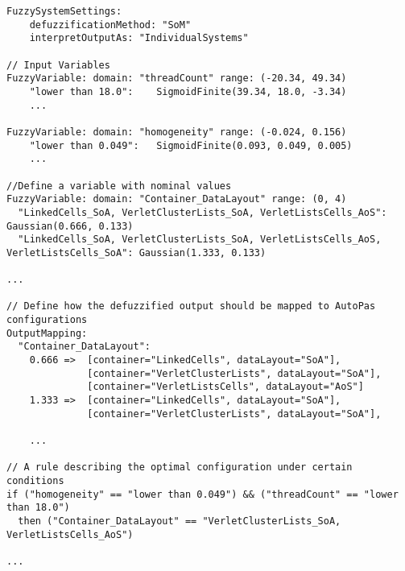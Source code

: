 \begin{lstlisting}[language=FuzzyLanguage, caption={Rule snippet depicting the Parameter Tuning Approach}, label={lst:parametertuningapproach}]
FuzzySystemSettings:
    defuzzificationMethod: "SoM"
    interpretOutputAs: "IndividualSystems"

// Input Variables
FuzzyVariable: domain: "threadCount" range: (-20.34, 49.34)
    "lower than 18.0":    SigmoidFinite(39.34, 18.0, -3.34)
    ...

FuzzyVariable: domain: "homogeneity" range: (-0.024, 0.156)
    "lower than 0.049":   SigmoidFinite(0.093, 0.049, 0.005)
    ...

//Define a variable with nominal values
FuzzyVariable: domain: "Container_DataLayout" range: (0, 4)
  "LinkedCells_SoA, VerletClusterLists_SoA, VerletListsCells_AoS":                       Gaussian(0.666, 0.133)
  "LinkedCells_SoA, VerletClusterLists_SoA, VerletListsCells_AoS, VerletListsCells_SoA": Gaussian(1.333, 0.133)

...

// Define how the defuzzified output should be mapped to AutoPas configurations
OutputMapping:
  "Container_DataLayout":
    0.666 =>  [container="LinkedCells", dataLayout="SoA"],
              [container="VerletClusterLists", dataLayout="SoA"],
              [container="VerletListsCells", dataLayout="AoS"]
    1.333 =>  [container="LinkedCells", dataLayout="SoA"],
              [container="VerletClusterLists", dataLayout="SoA"],

    ...

// A rule describing the optimal configuration under certain conditions
if ("homogeneity" == "lower than 0.049") && ("threadCount" == "lower than 18.0")
  then ("Container_DataLayout" == "VerletClusterLists_SoA, VerletListsCells_AoS")

...
\end{lstlisting}